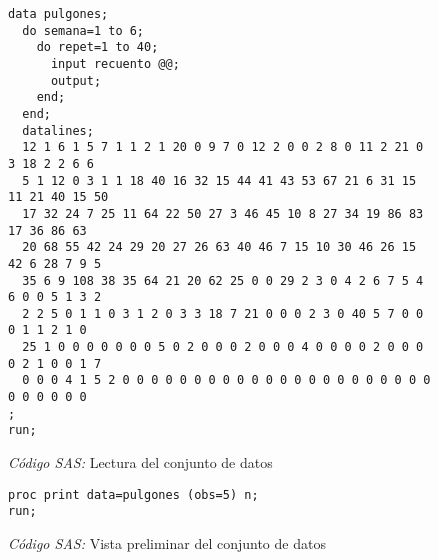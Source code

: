 \documentclass[11pt]{article}
\begin{document}
    \begin{figure}
      \centering
      \begin{verbatim}
data pulgones;
  do semana=1 to 6;
    do repet=1 to 40;
      input recuento @@;
      output;
    end;
  end;
  datalines;
  12 1 6 1 5 7 1 1 2 1 20 0 9 7 0 12 2 0 0 2 8 0 11 2 21 0 3 18 2 2 6 6
  5 1 12 0 3 1 1 18 40 16 32 15 44 41 43 53 67 21 6 31 15 11 21 40 15 50
  17 32 24 7 25 11 64 22 50 27 3 46 45 10 8 27 34 19 86 83 17 36 86 63
  20 68 55 42 24 29 20 27 26 63 40 46 7 15 10 30 46 26 15 42 6 28 7 9 5
  35 6 9 108 38 35 64 21 20 62 25 0 0 29 2 3 0 4 2 6 7 5 4 6 0 0 5 1 3 2
  2 2 5 0 1 1 0 3 1 2 0 3 3 18 7 21 0 0 0 2 3 0 40 5 7 0 0 0 1 1 2 1 0
  25 1 0 0 0 0 0 0 0 5 0 2 0 0 0 2 0 0 0 4 0 0 0 0 2 0 0 0 0 2 1 0 0 1 7
  0 0 0 4 1 5 2 0 0 0 0 0 0 0 0 0 0 0 0 0 0 0 0 0 0 0 0 0 0 0 0 0 0 0 0
;
run;
      \end{verbatim}
      \caption{\emph{Código SAS:} Lectura del conjunto de datos}
      \label{code:sas_1}
    \end{figure}


    \begin{figure}
      \centering
      \begin{verbatim}
proc print data=pulgones (obs=5) n;
run;
      \end{verbatim}
      \caption{\emph{Código SAS:} Vista preliminar del conjunto de datos}
      \label{code:sas_2}
    \end{figure}


    \nocite{rano2017}

    
    
\end{document}

